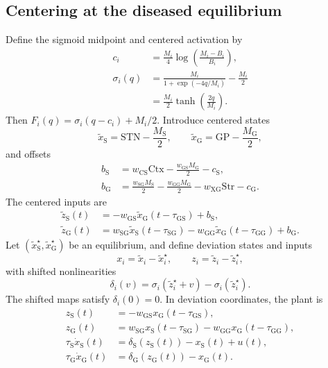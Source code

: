 \documentclass[9pt,twocolumn,twoside]{pnas-new}
\newcommand{\mrm}[1]{\mathrm{#1}}
\newcommand{\STN}{\mathrm{STN}}
\newcommand{\GP}{\mathrm{GP}}
\newcommand{\Ctx}{\mathrm{Ctx}}
\newcommand{\Str}{\mathrm{Str}}
\newcommand{\Srate}{\mathrm{S}}
\newcommand{\Grate}{\mathrm{G}}
\begin{document}
\subsection{Centering at the diseased equilibrium}

Define the sigmoid midpoint and centered activation by
\begin{equation}
\begin{aligned}
c_i&=\frac{M_i}{4}\log\!\left(\frac{M_i-B_i}{B_i}\right),\\
\sigma_i(q)&=\frac{M_i}{1+\exp(-4q/M_i)}-\frac{M_i}{2}\\
&=\frac{M_i}{2}\tanh\!\left(\frac{2q}{M_i}\right).
\end{aligned}
\label{eq:centered-sigmoid}
\end{equation}
Then $F_i(q)=\sigma_i(q-c_i)+M_i/2$. Introduce centered states
\begin{equation*}
\tilde x_{\Srate}=\STN-\frac{M_{\Srate}}{2},\qquad
\tilde x_{\Grate}=\GP-\frac{M_{\Grate}}{2},
\end{equation*}
and offsets
\begin{align*}
b_{\Srate}&=w_{\mrm{CS}}\Ctx-\frac{w_{\mrm{GS}}M_{\Grate}}{2}-c_{\Srate},\\
b_{\Grate}&=\frac{w_{\mrm{SG}}M_{\Srate}}{2}
-\frac{w_{\mrm{GG}}M_{\Grate}}{2}-w_{\mrm{XG}}\Str-c_{\Grate}.
\end{align*}
The centered inputs are
\begin{align*}
\tilde z_{\Srate}(t)&=-w_{\mrm{GS}}\tilde x_{\Grate}(t-\tau_{\mrm{GS}})+b_{\Srate},\\
\tilde z_{\Grate}(t)&=w_{\mrm{SG}}\tilde x_{\Srate}(t-\tau_{\mrm{SG}})
-w_{\mrm{GG}}\tilde x_{\Grate}(t-\tau_{\mrm{GG}})+b_{\Grate}.
\end{align*}
Let $(\tilde x_{\Srate}^\star,\tilde x_{\Grate}^\star)$ be an equilibrium, and define deviation states and inputs
\begin{equation*}
x_i=\tilde x_i-\tilde x_i^\star,\qquad
z_i=\tilde z_i-\tilde z_i^\star,
\end{equation*}
with shifted nonlinearities
\begin{equation}
\delta_i(v)=\sigma_i(\tilde z_i^\star+v)-\sigma_i(\tilde z_i^\star).
\label{eq:shifted-nonlinearity}
\end{equation}
The shifted maps satisfy $\delta_i(0)=0$. In deviation coordinates, the plant is
\begin{align}
z_{\Srate}(t)&=-w_{\mrm{GS}}x_{\Grate}(t-\tau_{\mrm{GS}}),\\
z_{\Grate}(t)&=w_{\mrm{SG}}x_{\Srate}(t-\tau_{\mrm{SG}})
-w_{\mrm{GG}}x_{\Grate}(t-\tau_{\mrm{GG}}),\\
\tau_{\Srate}\dot x_{\Srate}(t)&=\delta_{\Srate}(z_{\Srate}(t))-x_{\Srate}(t)+u(t),\\
\tau_{\Grate}\dot x_{\Grate}(t)&=\delta_{\Grate}(z_{\Grate}(t))-x_{\Grate}(t).
\label{eq:deviation-plant}
\end{align}
\end{document}
